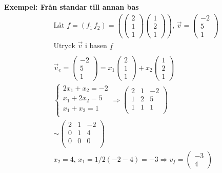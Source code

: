 \begin{multicols}{2}
\textbf{Exempel: Från standar till annan bas}
\begin{align*}
  &\text{Låt } \underline{f}=(f_1 \, f_2) =
  \left( \begin{pmatrix} 2 \\ 1 \\ 1 \end{pmatrix} \begin{pmatrix} 1 \\ 2 \\ 1 \end{pmatrix} \right), \,
  \vec{v} = \begin{pmatrix} -2 \\ 5 \\ 1 \end{pmatrix} \\
  &\text{Utryck $\vec{v}$ i basen $\underline{f}$} \\
  &\\
  &\vec{v}_{\underline{e}} = \begin{pmatrix} -2 \\ 5 \\ 1 \end{pmatrix} =
  x_1 \begin{pmatrix} 2 \\ 1 \\ 1 \end{pmatrix}  + x_2 \begin{pmatrix} 1 \\ 2 \\ 1 \end{pmatrix} \\
  &\left\{\begin{array}{rr}
  2x_1 + x_2 = -2 \\
  x_1 + 2x_2 = 5  \\
  x_1 + x_2 = 1   \\
  \end{array}\right. \Rightarrow{}
  \left(\begin{array}{cc|c}
    2 & 1 & -2   \\
    1 & 2 &  5  \\
    1 & 1 &  1  \\
  \end{array}\right) \\
  &\sim{}
  \left(\begin{array}{cc|c}
    2 & 1 & -2   \\
    0 & 1 &  4  \\
    0 & 0 &  0  \\
  \end{array}\right)  \\
  &x_2 = 4, \, x_1 = 1/2(-2 -4) = -3 \Rightarrow{} 
  v_{\underline{f}} = \begin{pmatrix} -3 \\ 4 \end{pmatrix} \\
\end{align*}


\end{multicols}

